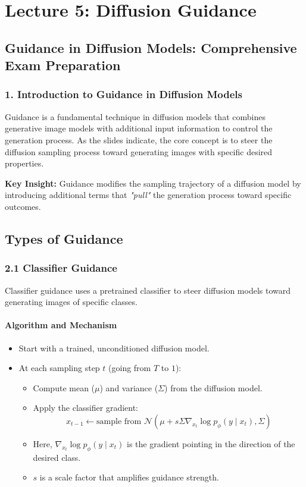 \chapter{\normalsize Lecture 5: Diffusion Guidance}

\section{Guidance in Diffusion Models: Comprehensive Exam Preparation}

\subsection*{1. Introduction to Guidance in Diffusion Models}

Guidance is a fundamental technique in diffusion models that combines generative image models with additional input information to control the generation process. As the slides indicate, the core concept is to steer the diffusion sampling process toward generating images with specific desired properties.

\textbf{Key Insight:} Guidance modifies the sampling trajectory of a diffusion model by introducing additional terms that \textit{"pull"} the generation process toward specific outcomes.

\section{Types of Guidance}

\subsection{2.1 Classifier Guidance}

Classifier guidance uses a pretrained classifier to steer diffusion models toward generating images of specific classes.

\subsubsection*{Algorithm and Mechanism}
\begin{itemize}
    \item Start with a trained, unconditioned diffusion model.
    \item At each sampling step $t$ (going from $T$ to $1$):
    \begin{itemize}
        \item Compute mean ($\mu$) and variance ($\Sigma$) from the diffusion model.
        \item Apply the classifier gradient:
        \[
        x_{t-1} \leftarrow \text{sample from } \mathcal{N}(\mu + s \Sigma \nabla_{x_t} \log p_\phi(y \mid x_t), \Sigma)
        \]
        \item Here, $\nabla_{x_t} \log p_\phi(y \mid x_t)$ is the gradient pointing in the direction of the desired class.
        \item $s$ is a scale factor that amplifies guidance strength.
    \end{itemize}
\end{itemize}

